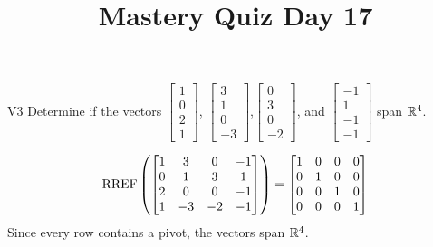 \documentclass{sbgLAquiz}
\title{Mastery Quiz Day 17 }
\begin{document}
\begin{problem}{V3}
Determine if the vectors $\begin{bmatrix} 1 \\ 0 \\ 2 \\1 \end{bmatrix}$, $\begin{bmatrix} 3 \\ 1 \\ 0 \\ -3 \end{bmatrix}$,$\begin{bmatrix} 0 \\ 3 \\ 0 \\ -2 \end{bmatrix}$, and $\begin{bmatrix}-1 \\ 1 \\ -1 \\ -1 \end{bmatrix}$ span $\mathbb{R}^4$.
\end{problem}
\begin{solution}
$$\operatorname{RREF}\left(\begin{bmatrix}1 & 3 & 0 & -1 \\ 0 & 1 & 3 & 1 \\ 2 & 0 & 0 & -1 \\ 1 & -3 & -2 & -1 \end{bmatrix} \right) =\begin{bmatrix} 1 & 0 & 0 & 0 \\ 0 & 1 & 0 & 0 \\ 0 & 0 & 1 & 0 \\ 0 & 0 & 0 & 1 \end{bmatrix}$$
Since every row contains a pivot, the vectors span $\mathbb{R}^4$.
\end{solution}
\end{document}

